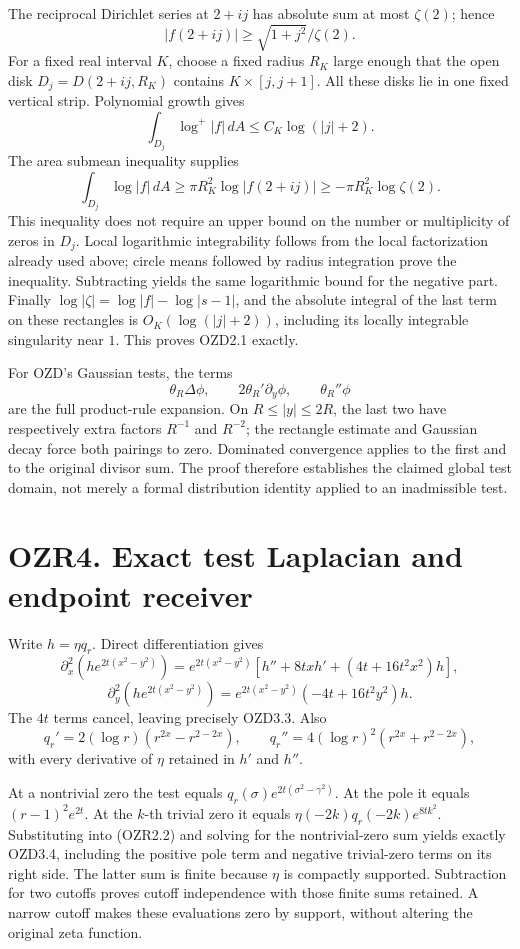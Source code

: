 The reciprocal Dirichlet series at \(2+ij\) has absolute sum at most
\(\zeta(2)\); hence \[
|f(2+ij)|\ge\sqrt{1+j^2}/\zeta(2).
\tag{OZR3.2}
\] For a fixed real interval \(K\), choose a fixed radius \(R_K\) large
enough that the open disk \(D_j=D(2+ij,R_K)\) contains
\(K\times[j,j+1]\). All these disks lie in one fixed vertical strip.
Polynomial growth gives \[
\int_{D_j}\log^+|f|\,dA\le C_K\log(|j|+2).
\] The area submean inequality supplies \[
\int_{D_j}\log|f|\,dA
\ge\pi R_K^2\log|f(2+ij)|\ge-\pi R_K^2\log\zeta(2).
\] This inequality does not require an upper bound on the number or
multiplicity of zeros in \(D_j\). Local logarithmic integrability
follows from the local factorization already used above; circle means
followed by radius integration prove the inequality. Subtracting yields
the same logarithmic bound for the negative part. Finally
\(\log|\zeta|=\log|f|-\log|s-1|\), and the absolute integral of the last
term on these rectangles is \(O_K(\log(|j|+2))\), including its locally
integrable singularity near \(1\). This proves OZD2.1 exactly.

For OZD's Gaussian tests, the terms \[
\theta_R\Delta\phi,\qquad 2\theta_R'\partial_y\phi,
\qquad \theta_R''\phi
\] are the full product-rule expansion. On \(R\le|y|\le2R\), the last
two have respectively extra factors \(R^{-1}\) and \(R^{-2}\); the
rectangle estimate and Gaussian decay force both pairings to zero.
Dominated convergence applies to the first and to the original divisor
sum. The proof therefore establishes the claimed global test domain, not
merely a formal distribution identity applied to an inadmissible test.

\section{OZR4. Exact test Laplacian and endpoint
receiver}\label{ozr4.-exact-test-laplacian-and-endpoint-receiver}

Write \(h=\eta q_r\). Direct differentiation gives \[
\partial_x^2(he^{2t(x^2-y^2)})
=e^{2t(x^2-y^2)}[h''+8txh'+(4t+16t^2x^2)h],
\] \[
\partial_y^2(he^{2t(x^2-y^2)})
=e^{2t(x^2-y^2)}(-4t+16t^2y^2)h.
\] The \(4t\) terms cancel, leaving precisely OZD3.3. Also \[
q_r'=2(\log r)(r^{2x}-r^{2-2x}),\qquad
q_r''=4(\log r)^2(r^{2x}+r^{2-2x}),
\] with every derivative of \(\eta\) retained in \(h'\) and \(h''\).

At a nontrivial zero the test equals
\(q_r(\sigma)e^{2t(\sigma^2-\gamma^2)}\). At the pole it equals
\((r-1)^2e^{2t}\). At the \(k\)-th trivial zero it equals
\(\eta(-2k)q_r(-2k)e^{8tk^2}\). Substituting into (OZR2.2) and solving
for the nontrivial-zero sum yields exactly OZD3.4, including the
positive pole term and negative trivial-zero terms on its right side.
The latter sum is finite because \(\eta\) is compactly supported.
Subtraction for two cutoffs proves cutoff independence with those finite
sums retained. A narrow cutoff makes these evaluations zero by support,
without altering the original zeta function.

